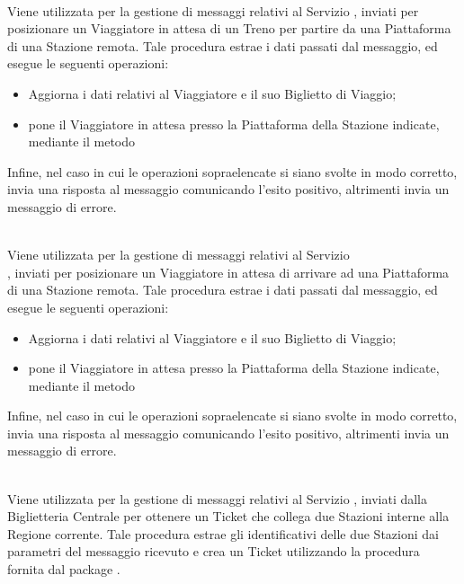 \begin{description}
		\item {}\\
		Viene utilizzata per la gestione di messaggi relativi al Servizio , inviati per posizionare un Viaggiatore in attesa di un Treno per partire da una Piattaforma di una Stazione remota. Tale procedura estrae i dati passati dal messaggio, ed esegue le seguenti operazioni:
		\begin{itemize}
			\item Aggiorna i dati relativi al Viaggiatore e il suo Biglietto di Viaggio;
			\item pone il Viaggiatore in attesa presso la Piattaforma della Stazione indicate, mediante il metodo 
		\end{itemize} 
		Infine, nel caso in cui le operazioni sopraelencate si siano svolte in modo corretto, invia una risposta al messaggio comunicando l'esito positivo, altrimenti invia un messaggio di errore.
		
		\item {}\\
		Viene utilizzata per la gestione di messaggi relativi al Servizio \\, inviati per posizionare un Viaggiatore in attesa di arrivare ad una Piattaforma di una Stazione remota. Tale procedura estrae i dati passati dal messaggio, ed esegue le seguenti operazioni:
		\begin{itemize}
			\item Aggiorna i dati relativi al Viaggiatore e il suo Biglietto di Viaggio;
			\item pone il Viaggiatore in attesa presso la Piattaforma della Stazione indicate, mediante il metodo 
		\end{itemize} 
		Infine, nel caso in cui le operazioni sopraelencate si siano svolte in modo corretto, invia una risposta al messaggio comunicando l'esito positivo, altrimenti invia un messaggio di errore.
		
		\item {}\\
		Viene utilizzata per la gestione di messaggi relativi al Servizio , inviati dalla Biglietteria Centrale per ottenere un Ticket che collega due Stazioni interne alla Regione corrente. Tale procedura estrae gli identificativi delle due Stazioni dai parametri del messaggio ricevuto e crea un Ticket utilizzando la procedura  fornita dal package .
		

\end{description}
